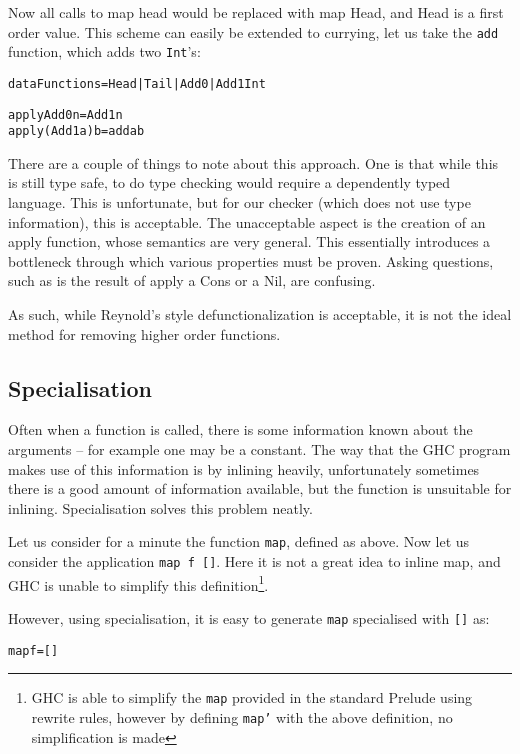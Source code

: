 \documentclass[preprint]{sigplanconf}
\newcommand{\T}[1]{\texttt{#1}}
\newenvironment{code}{\begin{alltt}\small}{\end{alltt}}
\begin{document}
Now all calls to map head would be replaced with map Head, and Head is a first
order value. This scheme can easily be extended to currying, let us take the
\T{add} function, which adds two \T{Int}'s:

\begin{code}
 data Functions = Head | Tail | Add0 | Add1 Int

 apply Add0 n = Add1 n
 apply (Add1 a) b = add a b
\end{code}

There are a couple of things to note about this approach. One is that while
this is still type safe, to do type checking would require a dependently typed
language. This is unfortunate, but for our checker (which does not use type
information), this is acceptable. The unacceptable aspect is the creation of an
apply function, whose semantics are very general. This essentially introduces a
bottleneck through which various properties must be proven. Asking questions,
such as is the result of apply a Cons or a Nil, are confusing.

As such, while Reynold's style defunctionalization is acceptable, it is not the
ideal method for removing higher order functions.

\subsection{Specialisation}

Often when a function is called, there is some information known about the
arguments -- for example one may be a constant. The way that the GHC program
makes use of this information is by inlining heavily, unfortunately sometimes
there is a good amount of information available, but the function is unsuitable
for inlining. Specialisation solves this problem neatly.

Let us consider for a minute the function \T{map}, defined as above. Now let us
consider the application \T{map f []}. Here it is not a great idea to inline
map, and GHC is unable to simplify this definition\footnote{GHC is able to
simplify the \T{map} provided in the standard Prelude using rewrite rules,
however by defining \T{map'} with the above definition, no simplification is
made}.

However, using specialisation, it is easy to generate \T{map} specialised with
\T{[]} as:

\begin{code}
 map f = []
\end{code}
\end{document}
